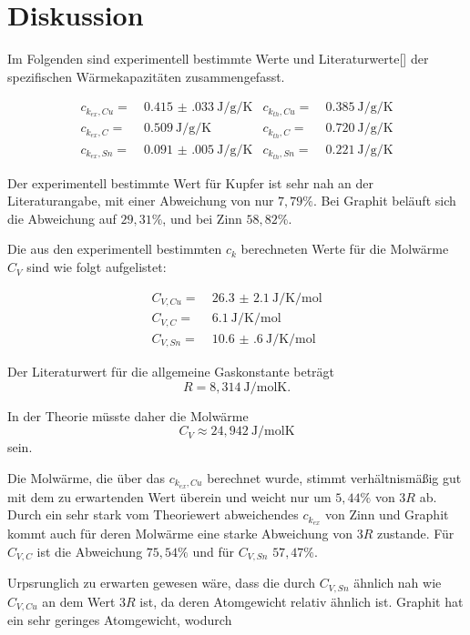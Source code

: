 \section{Diskussion}
\label{sec:Diskussion}

Im Folgenden sind experimentell bestimmte Werte und Literaturwerte[] der spezifischen Wärmekapazitäten zusammengefasst.

\begin{align*}
    c_{k_{ex},Cu} =& \:\SI{0.415(033)}{\joule\per\g\per\kelvin}&   c_{k_{th},Cu} =& \:\SI{0.385}{\joule\per\g\per\kelvin} \\
    c_{k_{ex},C} =& \:\SI{0.509}{\joule\per\g\per\kelvin}&   c_{k_{th},C} =& \:\SI{0,720}{\joule\per\g\per\kelvin} \\
    c_{k_{ex},Sn} =& \:\SI{0.091(005)}{\joule\per\g\per\kelvin}&   c_{k_{th},Sn} =& \:\SI{0.221}{\joule\per\g\per\kelvin} 
\end{align*}

Der experimentell bestimmte Wert für Kupfer ist sehr nah an der Literaturangabe, mit einer Abweichung von nur $7,79\si{\percent}$.
Bei Graphit beläuft sich die Abweichung auf $29,31\si{\percent}$, und bei Zinn $58,82\si{\percent}$. 

Die aus den experimentell bestimmten $c_k$ berechneten Werte für die Molwärme $C_V$ sind wie folgt aufgelistet:

\begin{align*}
    C_{V,Cu}=&\:\SI{26.3(21)}{\joule\per\kelvin\per\mol} \\
    C_{V,C}=&\:\SI{6.1}{\joule\per\kelvin\per\mol} \\
    C_{V,Sn}=&\:\SI{10.6(6)}{\joule\per\kelvin\per\mol}
\end{align*}

Der Literaturwert für die allgemeine Gaskonstante beträgt 
\begin{equation}
    R = 8,314\:\si{\joule\per\mol\kelvin}.
\end{equation}

In der Theorie müsste daher die Molwärme 
\begin{equation}
    C_V \approx 24,942\:\si{\joule\per\mol\kelvin}
\end{equation}
sein. 

Die Molwärme, die über das $c_{k_{ex},Cu}$ berechnet wurde, stimmt verhältnismäßig gut mit dem zu erwartenden Wert überein und weicht
nur um $5,44\si{\percent}$ von $3R$ ab. Durch ein sehr stark vom Theoriewert abweichendes $c_{k_{ex}}$ von Zinn und Graphit kommt auch
für deren Molwärme eine starke Abweichung von $3R$ zustande. Für $C_{V,C}$ ist die Abweichung $75,54\si{\percent}$ und für $C_{V,Sn}$
$57,47\si{\percent}$. 

Urpsrunglich zu erwarten gewesen wäre, dass die durch $C_{V,Sn}$ ähnlich nah wie $C_{V,Cu}$ an dem Wert $3R$ ist, da deren Atomgewicht
relativ ähnlich ist. Graphit hat ein sehr geringes Atomgewicht, wodurch 
